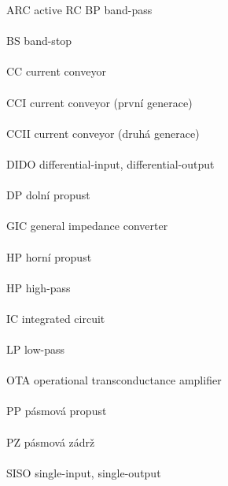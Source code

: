 ARC \hfill active RC
BP \hfill band-pass \\ \\
BS \hfill band-stop \\ \\
CC \hfill current conveyor \\ \\
CCI \hfill current conveyor (první generace) \\ \\
CCII \hfill current conveyor (druhá generace) \\ \\
DIDO \hfill differential-input, differential-output \\ \\
DP \hfill dolní propust \\ \\
GIC \hfill general impedance converter \\ \\
HP \hfill horní propust \\ \\
HP \hfill high-pass \\ \\
IC \hfill integrated circuit \\ \\
LP \hfill low-pass \\ \\
OTA \hfill operational transconductance amplifier \\ \\
PP \hfill pásmová propust \\ \\
PZ \hfill pásmová zádrž \\ \\
SISO \hfill single-input, single-output \\ \\
